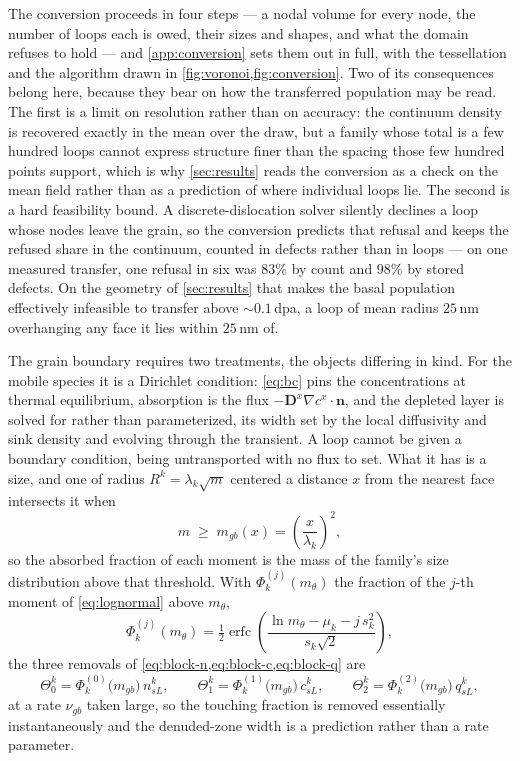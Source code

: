 The conversion proceeds in four steps --- a nodal volume for every node, the
number of loops each is owed, their sizes and shapes, and what the domain
refuses to hold --- and \cref{app:conversion} sets them out in full, with the
tessellation and the algorithm drawn in \cref{fig:voronoi,fig:conversion}. Two
of its consequences belong here, because they bear on how the transferred
population may be read. The first is a limit on resolution rather than on
accuracy: the continuum density is recovered exactly in the mean over the draw,
but a family whose total is a few hundred loops cannot express structure finer
than the spacing those few hundred points support, which is why
\cref{sec:results} reads the conversion as a check on the mean field rather
than as a prediction of where individual loops lie. The second is a hard
feasibility bound. A discrete-dislocation solver silently declines a loop whose
nodes leave the grain, so the conversion predicts that refusal and keeps the
refused share in the continuum, counted in defects rather than in loops --- on
one measured transfer, one refusal in six was $83\%$ by count and $98\%$ by
stored defects. On the geometry of \cref{sec:results} that makes the basal
population effectively infeasible to transfer above ${\sim}0.1\,$dpa, a
\cloop{} loop of mean radius $25\,$nm overhanging any face it lies within
$25\,$nm of.

The grain boundary requires two treatments, the objects differing in kind. For
the mobile species it is a Dirichlet condition: \cref{eq:bc} pins the
concentrations at thermal equilibrium, absorption is the flux
$-\bm D^{x}\nabla c^{x}\!\cdot\!\bm n$, and the depleted layer is solved for
rather than parameterized, its width set by the local diffusivity and sink
density and evolving through the transient. A loop cannot be given a
boundary condition, being untransported with no flux to set. What it has is a size, and one of radius $R^k=\lambda_k\sqrt m$ centered a
distance $x$ from the nearest face intersects it when
\begin{equation}
  m\;\ge\;m_{gb}(x)=\left(\frac{x}{\lambda_k}\right)^{2},
  \label{eq:mgb}
\end{equation}
so the absorbed fraction of each moment is the mass of the family's size
distribution above that threshold. With $\Phi^{(j)}_k(m_\theta)$ the fraction of
the $j$-th moment of \cref{eq:lognormal} above $m_\theta$,
\begin{equation}
  \Phi^{(j)}_k(m_\theta)
  =\tfrac12\operatorname{erfc}\!\left(
     \frac{\ln m_\theta-\mu_k-j\,s_k^{2}}{s_k\sqrt2}\right),
  \label{eq:Phij}
\end{equation}
the three removals of \cref{eq:block-n,eq:block-c,eq:block-q} are
\begin{equation}
  \Theta^k_0=\Phi^{(0)}_k\bigl(m_{gb}\bigr)\,n^k_{sL},
  \qquad
  \Theta^k_1=\Phi^{(1)}_k\bigl(m_{gb}\bigr)\,c^k_{sL},
  \qquad
  \Theta^k_2=\Phi^{(2)}_k\bigl(m_{gb}\bigr)\,q^k_{sL},
  \label{eq:gbloop}
\end{equation}
at a rate $\nu_{gb}$ taken large, so the touching fraction is removed
essentially instantaneously and the denuded-zone width is a prediction rather
than a rate parameter.

